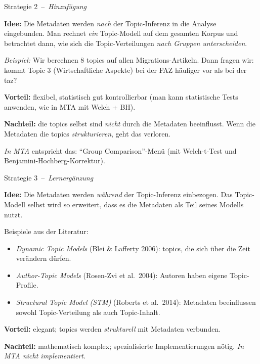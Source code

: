 \documentclass[aspectratio=169,11pt]{beamer}
\newcommand{\mdash}{\,{\monodash–}\,}
\let\oldemph\emph
\renewcommand{\emph}[1]{{\color{solCyan}\oldemph{#1}}}
\let\oldtextbf\textbf
\renewcommand{\textbf}[1]{{\color{solBase3}\oldtextbf{#1}}}
\begin{document}
\begin{frame}{Strategie 2 \mdash{} \emph{Hinzufügung}}

  \textbf{Idee:} Die Metadaten werden \emph{nach} der Topic-Inferenz
  in die Analyse eingebunden. Man rechnet \emph{ein} Topic-Modell auf
  dem gesamten Korpus und betrachtet dann, wie sich die
  Topic-Verteilungen \emph{nach Gruppen unterscheiden}.

  \vfill
  \emph{Beispiel:} Wir berechnen 8 topics auf allen Migrations-Artikeln.
  Dann fragen wir: kommt Topic 3 (Wirtschaftliche Aspekte) bei der FAZ
  häufiger vor als bei der taz?

  \vfill
  \textbf{Vorteil:} flexibel, statistisch gut kontrollierbar (man
  kann statistische Tests anwenden, wie in MTA mit Welch + BH).

  \vfill
  \textbf{Nachteil:} die topics selbst sind \emph{nicht} durch die
  Metadaten beeinflusst. Wenn die Metadaten die topics
  \emph{strukturieren}, geht das verloren.

  \vfill
  \footnotesize\color{black!60}
  \emph{In MTA} entspricht das: \enquote{Group Comparison}-Menü
  (mit Welch-t-Test und Benjamini-Hochberg-Korrektur).

\end{frame}

\begin{frame}{Strategie 3 \mdash{} \emph{Lernergänzung}}

  \textbf{Idee:} Die Metadaten werden \emph{während} der Topic-Inferenz
  einbezogen. Das Topic-Modell selbst wird so erweitert, dass es die
  Metadaten als Teil seines Modells nutzt.

  \vfill
  Beispiele aus der Literatur:
  \begin{itemize}
    \item \emph{Dynamic Topic Models} (Blei \& Lafferty 2006):
          topics, die sich über die Zeit verändern dürfen.
    \item \emph{Author-Topic Models} (Rosen-Zvi et al.\ 2004):
          Autoren haben eigene Topic-Profile.
    \item \emph{Structural Topic Model (STM)} (Roberts et al.\ 2014):
          Metadaten beeinflussen sowohl Topic-Verteilung als auch
          Topic-Inhalt.
  \end{itemize}

  \vfill
  \textbf{Vorteil:} elegant; topics werden \emph{strukturell} mit
  Metadaten verbunden.

  \vfill
  \textbf{Nachteil:} mathematisch komplex; spezialisierte Implementierungen
  nötig. \emph{In MTA nicht implementiert.}

\end{frame}
\end{document}
